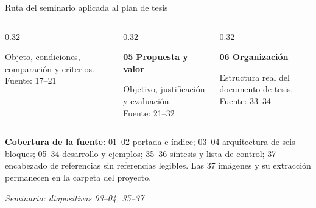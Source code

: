 \documentclass[aspectratio=169,10pt,spanish]{beamer}
\newcommand{\fuente}[1]{\vspace{0.05cm}\hfill{\color{bpNavy!65}\tiny\textit{Seminario: diapositivas #1}}}
\begin{document}
\begin{frame}{Ruta del seminario aplicada al plan de tesis}
\begin{columns}[T,onlytextwidth]
\begin{column}{0.32\textwidth}
\begin{tcolorbox}[height=1.68cm,colback=bpRust!7,colframe=bpRust,arc=1.2mm,valign=center]
                \raggedright\tiny Objeto, condiciones, comparación y criterios.\\[1mm]
                \tiny Fuente: 17--21
            \end{tcolorbox}
        \end{column}
        \begin{column}{0.32\textwidth}
            \begin{tcolorbox}[height=1.68cm,colback=bpBlue!7,colframe=bpBlue,arc=1.2mm,valign=center]
                \scriptsize\textbf{\color{bpBlue}05 \quad Propuesta y valor}\\[1mm]
                \raggedright\tiny Objetivo, justificación y evaluación.\\[1mm]
                \tiny Fuente: 21--32
            \end{tcolorbox}
        \end{column}
        \begin{column}{0.32\textwidth}
            \begin{tcolorbox}[height=1.68cm,colback=bpGreen!7,colframe=bpGreen,arc=1.2mm,valign=center]
                \scriptsize\textbf{\color{bpGreen}06 \quad Organización}\\[1mm]
                \raggedright\tiny Estructura real del documento de tesis.\\[1mm]
                \tiny Fuente: 33--34
            \end{tcolorbox}
        \end{column}
    \end{columns}
    \vspace{0.15cm}
    \begin{tcolorbox}[colback=bpNavy,colframe=bpNavy,arc=1mm,top=1mm,bottom=1mm]
        \centering\tiny\color{white}
        \textbf{Cobertura de la fuente:} 01--02 portada e índice; 03--04 arquitectura de seis bloques;
        05--34 desarrollo y ejemplos; 35--36 síntesis y lista de control; 37 encabezado de referencias
        sin referencias legibles. Las 37 imágenes y su extracción permanecen en la carpeta del proyecto.
    \end{tcolorbox}
    \fuente{03--04, 35--37}
\end{frame}
\end{document}

